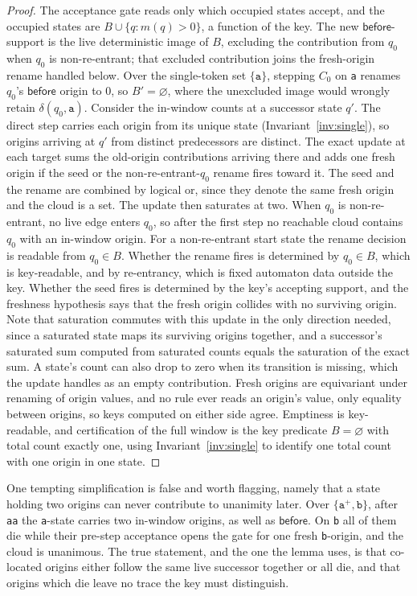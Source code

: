 \documentclass[11pt,a4paper]{article}
\theoremstyle{definition}
\theoremstyle{plain}
\newcommand{\code}[1]{\texttt{#1}}
\newcommand{\before}{\mathsf{before}}
\begin{document}
\begin{proof}
The acceptance gate reads only which occupied states accept, and the occupied states are $B \cup \{q : m(q) > 0\}$, a
function of the key. The new $\before$-support is the live deterministic image of $B$, excluding the contribution from
$q_0$ when $q_0$ is non-re-entrant; that excluded contribution joins the fresh-origin rename handled below. Over the
single-token set $\{\code{a}\}$, stepping $C_0$ on \code{a} renames $q_0$'s $\before$ origin to $0$, so
$B' = \varnothing$, where the unexcluded image would wrongly retain $\delta(q_0, \code{a})$. Consider the in-window
counts at a successor state $q'$. The direct step carries each origin from its unique state
(Invariant~\ref{inv:single}), so origins arriving at $q'$ from distinct predecessors are distinct. The exact update at
each target sums the old-origin contributions arriving there and adds one fresh origin if the seed or the
non-re-entrant-$q_0$ rename fires toward it. The seed and the rename are combined by logical or, since they denote the
same fresh origin and the cloud is a set. The update then saturates at two. When $q_0$ is non-re-entrant, no live edge
enters $q_0$, so after the first step no reachable cloud contains $q_0$ with an in-window origin. For a non-re-entrant
start state the rename decision is readable from $q_0 \in B$. Whether the rename fires is determined by $q_0 \in B$,
which is key-readable, and by re-entrancy, which is fixed automaton data outside the key. Whether the seed fires is
determined by the key's accepting support, and the freshness hypothesis says that the fresh origin collides with no
surviving origin. Note that saturation commutes with this update in the only direction needed, since a saturated state
maps its surviving origins together, and a successor's saturated sum computed from saturated counts equals the
saturation of the exact sum. A state's count can also drop to zero when its transition is missing, which the update
handles as an empty contribution. Fresh origins are equivariant under renaming of origin values, and no rule ever reads
an origin's value, only equality between origins, so keys computed on either side agree. Emptiness is key-readable, and
certification of the full window is the key predicate $B = \varnothing$ with total count exactly one, using
Invariant~\ref{inv:single} to identify one total count with one origin in one state.
\end{proof}

One tempting simplification is false and worth flagging, namely that a state holding two origins can never contribute to
unanimity later. Over $\{\code{a}^+, \code{b}\}$, after \code{aa} the \code{a}-state carries two in-window origins, as
well as $\before$. On \code{b} all of them die while their pre-step acceptance opens the gate for one fresh
\code{b}-origin, and the cloud is unanimous. The true statement, and the one the lemma uses, is that co-located origins
either follow the same live successor together or all die, and that origins which die leave no trace the key must
distinguish.
\end{document}
